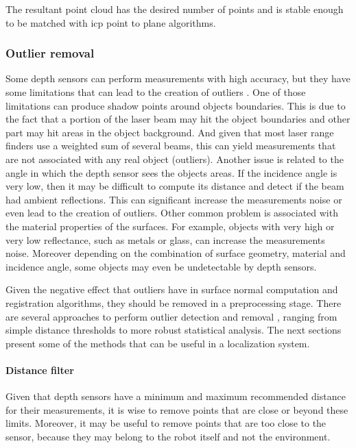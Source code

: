 The resultant point cloud has the desired number of points and is stable enough to be matched with \gls{icp} point to plane algorithms.


\subsubsection{Outlier removal}

Some depth sensors can perform measurements with high accuracy, but they have some limitations that can lead to the creation of outliers \cite{Sotoodeh2006}. One of those limitations can produce shadow points around objects boundaries. This is due to the fact that a portion of the laser beam may hit the object boundaries and other part may hit areas in the object background. And given that most laser range finders use a weighted sum of several beams, this can yield measurements that are not associated with any real object (outliers). Another issue is related to the angle in which the depth sensor sees the objects areas. If the incidence angle is very low, then it may be difficult to compute its distance and detect if the beam had ambient reflections. This can significant increase the measurements noise or even lead to the creation of outliers. Other common problem is associated with the material properties of the surfaces. For example, objects with very high or very low reflectance, such as metals or glass, can increase the measurements noise. Moreover depending on the combination of surface geometry, material and incidence angle, some objects may even be undetectable by depth sensors.

Given the negative effect that outliers have in surface normal computation and registration algorithms, they should be removed in a preprocessing stage. There are several approaches to perform outlier detection and removal \cite{YangZhang2010}, ranging from simple distance thresholds to more robust statistical analysis. The next sections present some of the methods that can be useful in a localization system.


\paragraph{Distance filter}

Given that depth sensors have a minimum and maximum recommended distance for their measurements, it is wise to remove points that are close or beyond these limits. Moreover, it may be useful to remove points that are too close to the sensor, because they may belong to the robot itself and not the environment.

